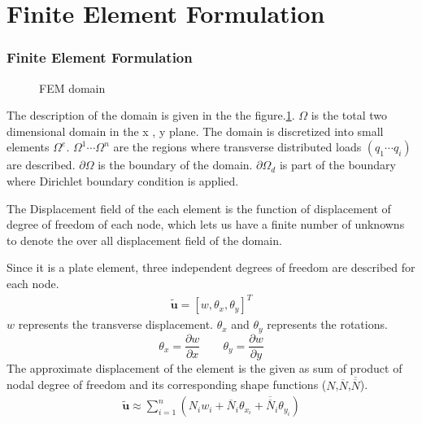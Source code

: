 \documentclass[9pt]{beamer}
\begin{document}
\section{Finite Element Formulation}
\begin{frame}\frametitle{Finite Element Formulation}
\begin{figure}[h]
\centering

\caption{FEM domain}
\label{fig:fem_domain}
\end{figure}


The description of the domain is given in the the figure.\ref{fig:fem_domain}.  $\Omega$ is the total two dimensional domain in the x , y plane. The domain is discretized into small elements $\Omega^e$. $\Omega^1 \cdots \Omega^n$ are the regions where transverse distributed loads $(q_1 \cdots q_i)$ are described. $\partial \Omega$ is the boundary of the domain. $\partial \Omega _ d$ is part of the boundary where Dirichlet boundary condition is applied. 


\end{frame}

\begin{frame}
The Displacement field of the each element is the function of displacement of degree of freedom of each  node, which lets us have a finite number of unknowns to denote the over all displacement field of the domain. 

Since it is a plate element, three independent degrees of freedom are described for each node. 
\begin{equation*}
\begin{split}
\tilde{\mathbf{u}} = \left[ w, \theta_x , \theta_y  \right]^T
\end{split}
\end{equation*}
$w$ represents the transverse displacement. $\theta_x$ and $\theta_y$ represents the rotations. 
\begin{equation}
\theta_x =\frac{\partial w}{\partial x} \qquad
 \theta_y  =\frac{\partial w}{\partial y}
\end{equation}
The approximate displacement of the element is the given as sum of product of nodal degree of freedom and its corresponding shape functions ($N$,$\overline{N}$,$\overline{\overline{N}}$).
\begin{equation}\label{eq:approx_disp}
\begin{split}
\tilde{\mathbf{u}} \approx \sum_{i=1}^{n}\left(N_iw_i+\overline{N}_i\theta_{x_i} +\overline{\overline{N}}_i\theta_{y_i}\right)
\end{split}
\end{equation}

\end{frame}
\end{document}
